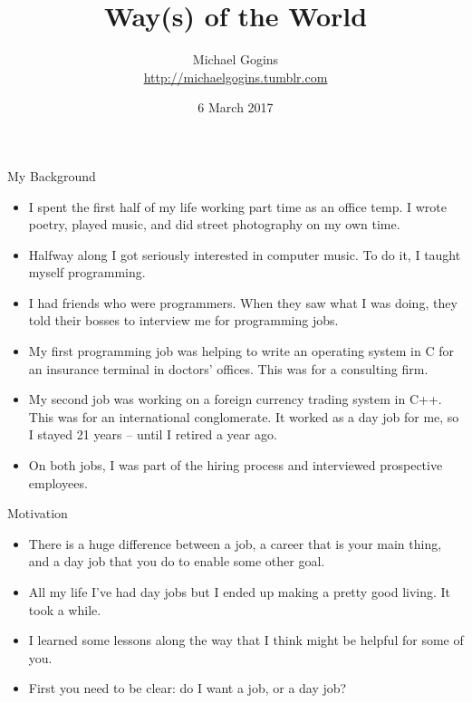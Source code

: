 \documentclass{beamer}
\title[The Way(s) of the World] %
{Way(s) of the World}
\author[Gogins] %
{Michael Gogins\\
\url{http://michaelgogins.tumblr.com} 
}
\institute[Irreducible Productions] %
{
  Irreducible Productions\\
  New York
}
\date[6 March 2017] %
{6 March 2017}
\begin{document}

\begin{frame}
  \titlepage
\end{frame}

\begin{frame}{My Background}
  \begin{itemize}
  \item
    I spent the first half of my life working part time as an office temp. I wrote poetry, played music, and did street photography on my own time.
  \item
    Halfway along I got seriously interested in computer music. To do it, I taught myself programming.
  \item
    I had friends who were programmers. When they saw what I was doing, they told their bosses to interview me for programming jobs.
  \item 
    My first programming job was helping to write an operating system in C for an insurance terminal in doctors' offices. This was for a consulting firm.
  \item
    My second job was working on a foreign currency trading system in C++. This was for an international conglomerate. It worked as a day job for me, so I stayed 21 years -- until I retired a year ago.
  \item
    On both jobs, I was part of the hiring process and interviewed prospective employees.
  \end{itemize}
\end{frame}


\begin{frame}{Motivation}
  \begin{itemize}
  \item
    There is a huge difference between a job, a career that is your main thing, and a day job that you do to enable some other goal.
  \item
    All my life I've had day jobs but I ended up making a pretty good living. It took a while.
  \item
    I learned some lessons along the way that I think might be helpful for some of you. 
  \item
    First you need to be clear: do I want a job, or a day job?
  \end{itemize}
\end{frame}
\end{document}
